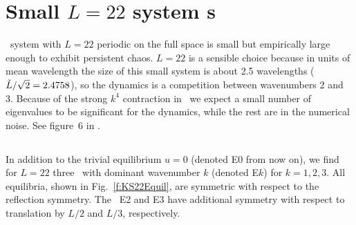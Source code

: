 %


\section{Small $L=22$ system {\rpo s}}
\label{s:L22}


\KS\ system with $L = 22$ periodic on the full space is small but
empirically large enough to exhibit persistent chaos.  $L=22$ is a
sensible choice because in units of mean wavelength the size of this
small system is about 2.5 wavelengths ($\tilde{L}/\sqrt{2}= 2.4758$),
so the dynamics is a competition between wavenumbers 2 and 3.
Because of the strong $k^4$ contraction in \KS\ we expect a small
number of eigenvalues to be significant for the dynamics, while the
rest are in the numerical noise. See figure~6 in
.


\subsection{\Eqva}

In addition to the trivial equilibrium $u=0$ (denoted E0 from now
on), we find for $L = 22$ three \eqva\ with dominant wavenumber $k$
(denoted E$k$) for $k = 1, 2, 3$.  All equilibria, shown in
Fig.~\ref{f:KS22Equil}, are symmetric with respect to the reflection
symmetry. The \eqva\ E2 and E3 have additional symmetry with respect
to translation by $L/2$ and $L/3$, respectively.

